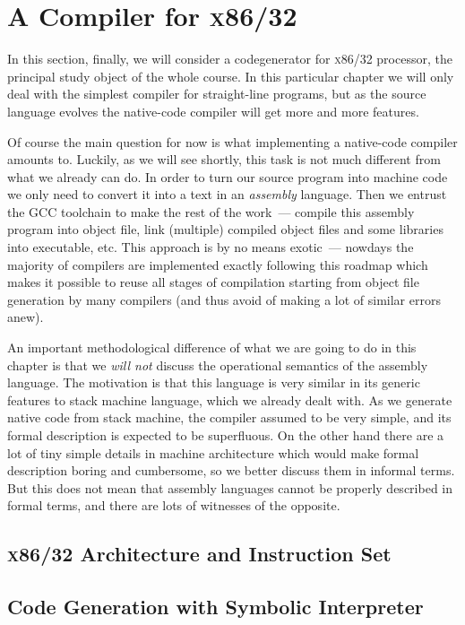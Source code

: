 \chapter{A Compiler for \textsc{x86/32}}

In this section, finally, we will consider a codegenerator for \textsc{x86/32} processor, the principal study object of the whole course. In this particular chapter we will only deal with the simplest compiler for straight-line programs, but as the source language evolves the native-code compiler will get more and more features.

Of course the main question for now is what implementing a native-code compiler amounts to. Luckily, as we will see shortly, this task is not much different from what we already can do. In order to turn our source program into machine code we only need to convert it into a text in an \emph{assembly} language. Then we entrust the \textsc{GCC} toolchain to make the rest of the work~--- compile this assembly program into object file, link (multiple) compiled object files and some libraries into executable, etc. This approach is by no means exotic~--- nowdays the majority of compilers are implemented exactly following this roadmap which makes it possible to reuse all stages of compilation starting from object file generation by many compilers (and thus avoid of making a lot of similar errors anew).

An important methodological difference of what we are going to do in this chapter is that we \emph{will not} discuss the operational semantics of the assembly language. The motivation is that this language is very similar in its generic features to stack machine language, which we already dealt with. As we generate native code from stack machine, the compiler assumed to be very simple, and its formal description is expected to be superfluous. On the other hand there are a lot of tiny simple details in machine architecture which would make formal description boring and cumbersome, so we better discuss them in informal terms. But this does not mean that assembly languages cannot be properly described in formal terms, and there are lots of witnesses of the opposite.

\section{\textsc{x86/32} Architecture and Instruction Set}

\section{Code Generation with Symbolic Interpreter}

\section{}


